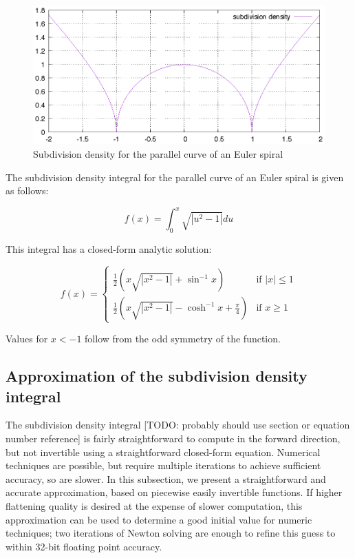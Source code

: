 \documentclass[sigconf, authordraft]{acmart}
\begin{document}
\begin{figure}
    \includegraphics[scale=0.6]{subdiv_density}
    \caption{Subdivision density for the parallel curve of an Euler spiral}
    \label{fig:subdiv_density}
\end{figure}

The subdivision density integral for the parallel curve of an Euler spiral is given as follows:

\[
    f(x) = \int_0^x\sqrt{|u^2 - 1|} du
\]

This integral has a closed-form analytic solution:

\[
    f(x) = \left\{
        \begin{array}{rl}
            \frac{1}{2}(x\sqrt{|x^2-1|} + \sin^{-1}x) & \text{if } |x| \leq 1 \\
            \frac{1}{2}(x\sqrt{|x^2-1|} - \cosh^{-1}x + \frac{\pi}{4}) & \text{if } x \geq 1
        \end{array}
    \right.
\]

Values for $x<-1$ follow from the odd symmetry of the function. 


\subsection{Approximation of the subdivision density integral}

The subdivision density integral [TODO: probably should use section or equation number reference] is fairly straightforward to compute in the forward direction, but not invertible using a straightforward closed-form equation. Numerical techniques are possible, but require multiple iterations to achieve sufficient accuracy, so are slower. In this subsection, we present a straightforward and accurate approximation, based on piecewise easily invertible functions. If higher flattening quality is desired at the expense of slower computation, this approximation can be used to determine a good initial value for numeric techniques; two iterations of Newton solving are enough to refine this guess to within 32-bit floating point accuracy.
\end{document}
